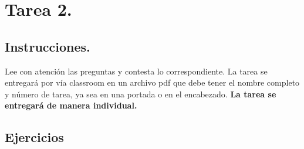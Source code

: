 \documentclass[12pt]{article}
\begin{document}

{\color{blue} \section*{Tarea 2.}}

{\color{blue} \subsection*{Instrucciones.}}
\vspace{0.5em} 

Lee con atención las preguntas y contesta lo correspondiente. La tarea se entregará por vía classroom
en un archivo pdf que debe tener el nombre completo y número de tarea, ya sea en una portada o en el encabezado.
\textbf{La tarea se entregará de manera individual.}\\

{\color{blue} \subsection*{Ejercicios}}
\vspace{0.5em}
\end{document}
